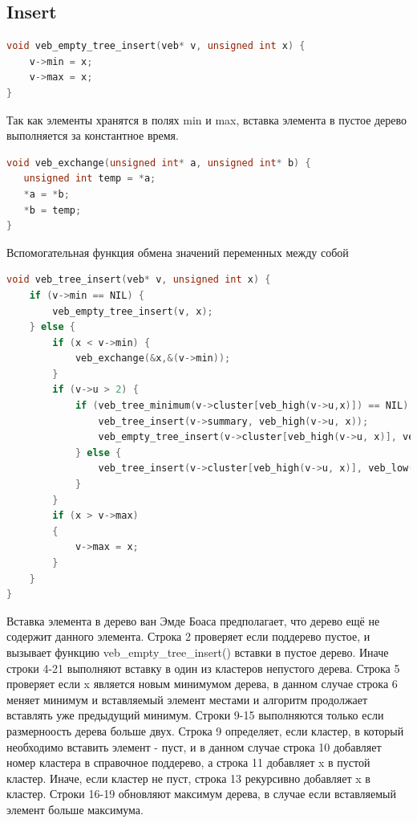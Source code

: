\documentclass{article}
\begin{document}
\subsection{Insert}
\begin{lstlisting}[language=C,style=C]
void veb_empty_tree_insert(veb* v, unsigned int x) {
    v->min = x;
    v->max = x;
}
\end{lstlisting}
Так как элементы хранятся в полях min и max, вставка элемента в пустое дерево выполняется за константное время.
\begin{lstlisting}[language=C,style=C]
void veb_exchange(unsigned int* a, unsigned int* b) {
   unsigned int temp = *a;
   *a = *b;
   *b = temp;
}
\end{lstlisting}
Вспомогательная функция обмена значений переменных между собой
\begin{lstlisting}[language=C,style=C]
void veb_tree_insert(veb* v, unsigned int x) {
    if (v->min == NIL) {
        veb_empty_tree_insert(v, x);
    } else {
        if (x < v->min) { 
            veb_exchange(&x,&(v->min));
        }
        if (v->u > 2) {
            if (veb_tree_minimum(v->cluster[veb_high(v->u,x)]) == NIL) {
                veb_tree_insert(v->summary, veb_high(v->u, x));
                veb_empty_tree_insert(v->cluster[veb_high(v->u, x)], veb_low(v->u, x));
            } else {
                veb_tree_insert(v->cluster[veb_high(v->u, x)], veb_low(v->u, x));
            }
        }
        if (x > v->max)
        {
            v->max = x;
        }
    }
}
\end{lstlisting}
Вставка элемента в дерево ван Эмде Боаса предполагает, что дерево ещё не содержит данного элемента.
Строка 2 проверяет если поддерево пустое, и вызывает функцию veb\_empty\_tree\_insert() вставки в пустое дерево. Иначе строки 4-21 выполняют вставку в один из кластеров непустого дерева. Строка 5 проверяет если x является новым минимумом дерева, в данном случае строка 6 меняет минимум и вставляемый элемент местами и алгоритм продолжает вставлять уже предыдущий минимум. Строки 9-15 выполняются только если размерноость дерева больше двух. Строка 9 определяет, если кластер, в который необходимо вставить элемент - пуст, и в данном случае строка 10 добавляет номер кластера в справочное поддерево, а строка 11 добавляет x в пустой кластер. Иначе, если кластер не пуст, строка 13 рекурсивно добавляет x в кластер. Строки 16-19 обновляют максимум дерева, в случае если вставляемый элемент больше максимума.
\end{document}
